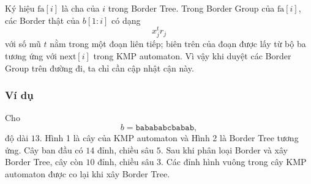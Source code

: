 \documentclass[11pt]{article}
\begin{document}
Ký hiệu \(\mathrm{fa}[i]\) là cha của \(i\) trong Border Tree. Trong Border
Group của \(\mathrm{fa}[i]\), các Border thật của \(b[1:i]\) có dạng
\[
  x_j^tr_j
\]
với số mũ \(t\) nằm trong một đoạn liên tiếp; biên trên của đoạn được lấy từ bộ
ba tương ứng với \(\mathrm{next}[i]\) trong KMP automaton. Vì vậy khi duyệt các
Border Group trên đường đi, ta chỉ cần cập nhật cận này.

\subsubsection{Ví dụ}

Cho
\[
  b=\texttt{babababcbabab},
\]
độ dài \(13\). Hình 1 là cây của KMP automaton và Hình 2 là Border Tree tương
ứng. Cây ban đầu có \(14\) đỉnh, chiều sâu \(5\). Sau khi phân loại Border và
xây Border Tree, cây còn \(10\) đỉnh, chiều sâu \(3\). Các đỉnh hình vuông
trong cây KMP automaton được co lại khi xây Border Tree.
\end{document}
